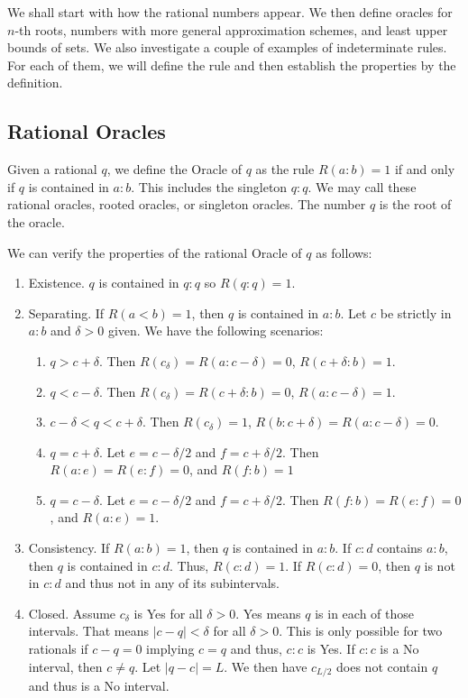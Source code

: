 \documentclass[12pt]{article}
\begin{document}
We shall start with how the rational numbers appear. We then define oracles for $n$-th roots,  numbers with more general approximation schemes, and least upper bounds of sets. We also investigate a couple of examples of indeterminate rules. For each of them, we will define the rule and then establish the properties by the definition. 

\subsection{Rational Oracles}\label{sec:rat-ora}

Given a rational $q$, we define the Oracle of $q$ as the rule $R(a:b) = 1$ if and only if $q$ is contained in $a:b$. This includes the singleton $q:q$.  We may call these rational oracles, rooted oracles, or singleton oracles. The number $q$ is the root of the oracle. 

We can verify the properties of the rational Oracle of $q$ as follows: 

\begin{enumerate}
    
    \item Existence. $q$ is contained in $q:q$ so $R(q:q)=1$.
    \item Separating. If $R(a \lt b) =1$, then $q$ is contained in $a : b$. Let $c$ be strictly in $a:b$ and $\delta > 0 $ given. We have the following scenarios: 
    \begin{enumerate}
    \item $q> c + \delta$. Then $R(c_\delta) = R(a:c-\delta) = 0$, $R(c+\delta:b)  = 1$.
    \item $q < c- \delta$. Then $R(c_\delta) = R(c+\delta:b) = 0$, $R(a:c-\delta)  = 1$.
    \item $c-\delta < q < c + \delta$. Then $R(c_\delta)=1$, $R(b:c+\delta) = R(a:c-\delta) = 0$.
    \item $q = c+\delta$. Let $e= c-\delta/2$ and $f=c+\delta/2$. Then $R(a:e)=R(e:f) = 0$, and $R(f:b) = 1$
    \item $q = c-\delta$.  Let $e= c-\delta/2$ and $f=c+\delta/2$. Then $R(f:b)=R(e:f) = 0$, and $R(a:e) = 1$.
    \end{enumerate}    
    \item Consistency. If $R(a:b)=1$, then $q$ is contained in $a:b$. If $c:d$ contains $a:b$, then $q$ is contained in $c:d$. Thus, $R(c:d)=1$. If $R(c:d) = 0$, then $q$ is not in $c:d$ and thus not  in any of its subintervals. 
    \item Closed. Assume $c_\delta$ is Yes for all  $\delta > 0$. Yes means $q$ is in each of those intervals. That means $|c-q|<\delta$ for all $\delta > 0$. This is only possible for two rationals if $c-q = 0$ implying $c=q$ and thus, $c:c$ is Yes. If $c:c$ is a No interval, then $c \neq q$. Let $|q-c| = L$. We then have $c_{L/2}$ does not contain $q$ and thus is a No interval. 
\end{enumerate}
\end{document}
